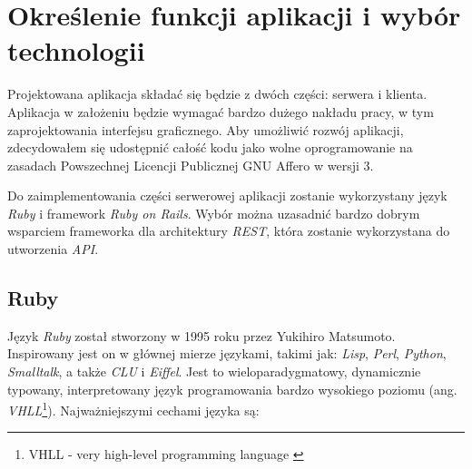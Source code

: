 \documentclass[a4paper,12pt]{article}
\begin{document}
\clearpage

\section{Określenie funkcji aplikacji i wybór technologii}
Projektowana aplikacja składać się będzie z dwóch części: serwera i
klienta. Aplikacja w założeniu będzie wymagać bardzo dużego nakładu
pracy, w tym zaprojektowania interfejsu graficznego. Aby umożliwić
rozwój aplikacji, zdecydowałem się udostępnić całość kodu jako wolne
oprogramowanie na zasadach Powszechnej Licencji Publicznej GNU Affero
w wersji 3\cite{affero}.

Do zaimplementowania części serwerowej aplikacji zostanie wykorzystany
język \emph{Ruby} i framework \emph{Ruby on Rails}. Wybór można
uzasadnić bardzo dobrym wsparciem frameworka dla architektury
\emph{REST}, która zostanie wykorzystana do utworzenia \emph{API}.

\subsection{Ruby}
Język \emph{Ruby} został stworzony w 1995 roku przez Yukihiro
Matsumoto. Inspirowany jest on w głównej mierze językami, takimi jak:
\emph{Lisp}, \emph{Perl}, \emph{Python}, \emph{Smalltalk}, a także
\emph{CLU} i \emph{Eiffel}. Jest to wieloparadygmatowy, dynamicznie
typowany, interpretowany język programowania bardzo wysokiego poziomu
(ang. \emph{VHLL}\footnote{VHLL - very high-level programming language
  \cite{vhll}})\cite{ruby}. Najważniejszymi cechami języka są:
\end{document}
